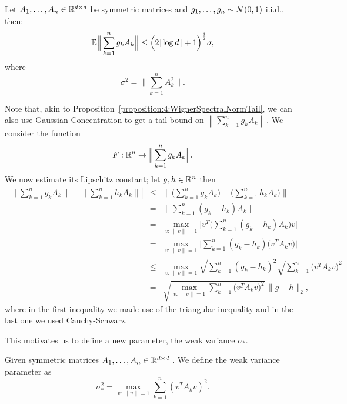 \begin{theorem}\label{thm:4:Gaussianseries}
Let $A_1,\dots,A_n\in \mathbb{R}^{d\times d}$ be symmetric matrices and $g_1,\dots,g_n\sim\mathcal{N}(0,1)$ i.i.d., then: 
\begin{equation}\label{logterm}
\mathbb{E} \Big\| \sum_{k=1}^{n} g_k A_k \Big\| \leq \Big(  2\lceil \log d \rceil+1  \Big)^{\frac12} \sigma,
\end{equation}
where
\begin{equation}\label{eq:4:sigma:forGaussianseries}
\sigma^2 = \Big\| \sum_{k=1}^n A_k^2  \Big\|. 
\end{equation}
\end{theorem}


Note that, akin to Proposition~\ref{proposition:4:WignerSpectralNormTail}, we can also use Gaussian Concentration to get a tail bound on $\left\| \sum_{k=1}^{n} g_k A_k \right\|$. We consider the function
\[
F:\mathbb{R}^n \to \Big\| \sum_{k=1}^n g_kA_k \Big\|.
\]
We now estimate its Lipschitz constant; let $g,h\in\mathbb{R}^n$ then
\begin{eqnarray*}
 \left| \Big\| \sum_{k=1}^n g_kA_k \Big\| -  \Big\| \sum_{k=1}^n h_kA_k \Big\| \right| & \leq & \Big\| \Big(\sum_{k=1}^n g_kA_k\Big) -  \Big( \sum_{k=1}^n h_kA_k \Big) \Big\| \\
 & = & \Big\| \sum_{k=1}^n (g_k-h_k)A_k \Big\| \\
 & = & \max_{v:\,\|v\|=1 } \Big|v^T\Big( \sum_{k=1}^n (g_k-h_k)A_k \Big) v \Big|\\
 & = & \max_{v:\,\|v\|=1 } \Big| \sum_{k=1}^n (g_k-h_k)\Big(v^TA_kv\Big) \Big| \\
 & \leq & \max_{v:\,\|v\|=1 } \sqrt{\sum_{k=1}^n (g_k-h_k)^2} \sqrt{\sum_{k=1}^n \Big(v^TA_kv\Big)^2}\\
 & = & \sqrt{ \max_{v:\,\|v\|=1 } \sum_{k=1}^n \Big(v^TA_kv\Big)^2}\,  \|g-h\|_2,
\end{eqnarray*}
where in the first inequality we made use of the triangular inequality and in the last one we used Cauchy-Schwarz.

This motivates us to define a new parameter, the weak variance $\sigma_\ast$.

\begin{definition}
 Given symmetric matrices $A_1,\dots,A_n\in\mathbb{R}^{d\times d}$ . We define the weak variance parameter as
 \[
  \sigma_\ast^2 = \max_{v:\,\|v\|=1 } \sum_{k=1}^n \left(v^TA_kv\right)^2.
 \]
\end{definition}

